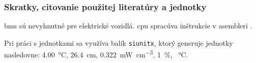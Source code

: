 \begin{frame}
	\frametitle{Skratky, citovanie použitej literatúry a jednotky}
	
	\gls{bms} sú nevyhnutné pre elektrické vozidlá.
	\gls{cpu} spracúva inštrukcie v asembleri \cite{nuclearfissionuranium235, Kropczyk2026, Jayabal2024}.
	
	\vspace{4mm}
	
	Pri práci s jednotkami sa využíva balík \texttt{siunitx}, ktorý generuje jednotky nasledovne: \SI{4.00}{\celsius}, \SI{26.4}{\centi\metre}, \SI{0.322}{\milli\watt\per\cubic\centi\metre}, \SI{1}{\percent}, \SI{}{\celsius}.
	
\end{frame}
